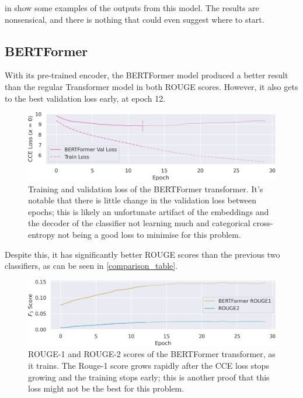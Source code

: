  in \appendixA show some examples of the outputs from this model.
The results are nonsensical, and there is nothing that could even suggest where to start.

\subsection{BERTFormer}

With its pre-trained encoder, the BERTFormer model produced a better result than the regular Transformer model in both ROUGE scores.
However, it also gets to the best validation loss early, at epoch 12.

\begin{figure}[h]
	\includegraphics[width=\textwidth]{bertformer_loss.png}
	\caption{Training and validation loss of the BERTFormer transformer. It's notable that there is little change in the validation loss between epochs; this is likely an unfortunate artifact of the embeddings and the decoder of the classifier not learning much and categorical cross-entropy not being a good loss to minimise for this problem.}
\end{figure}

Despite this, it has significantly better ROUGE scores than the previous two classifiers, as can be seen in \cref{comparison_table}.

\begin{figure}[h]
	\includegraphics[width=\textwidth]{bertformer_rouge.png}
	\caption{ROUGE-1 and ROUGE-2 scores of the BERTFormer transformer, as it trains. The Rouge-1 score grows rapidly after the CCE loss stops growing and the training stops early; this is another proof that this loss might not be the best for this problem.}
\end{figure}

